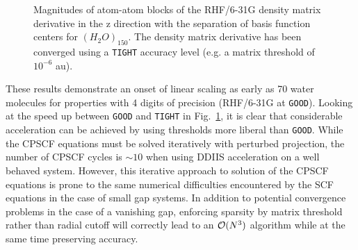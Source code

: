 \documentclass[prl,aps,preprint,showpacs,superbib]{revtex4}
\begin{document}
{\begin{figure}
  \caption{\protect
    Magnitudes of atom-atom blocks of the RHF/6-31G density matrix derivative
    in the z direction with the separation of basis function centers for $(H_2O)_{150}$.
    The density matrix derivative has been converged using a {\tt TIGHT} accuracy level (e.g. 
    a matrix threshold of $10^{-6}$ au).
  }\label{fig:DPrimeZ_150_6-31G}
\end{figure}
}

These results demonstrate an onset of linear scaling as early as 70 water molecules
for properties with 4 digits of precision (RHF/6-31G at {\tt GOOD}). Looking at the
speed up between {\tt GOOD} and {\tt TIGHT} in Fig.~\ref{fig:DPrimeZ_150_6-31G}, it is clear
that considerable acceleration can be achieved by using thresholds more liberal than 
{\tt GOOD}.  While the CPSCF equations must be solved iteratively with perturbed projection,  
the number of CPSCF cycles is $\sim 10$ when using DDIIS acceleration on a well behaved system.
However, this iterative approach to solution of the CPSCF equations is prone to the same 
numerical difficulties encountered by the SCF equations in the case of small gap systems.  
In addition to potential convergence problems in the case of a vanishing gap, enforcing 
sparsity by matrix threshold rather than radial cutoff will correctly lead to an ${\cal O}(N^3)$ 
algorithm while at the same time preserving accuracy.
\end{document}
